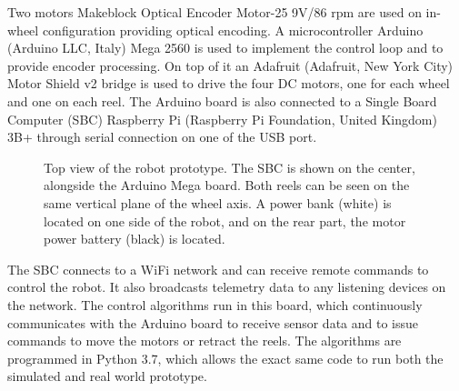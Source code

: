 \documentclass[journal]{IEEEtran}
\begin{document}
Two motors Makeblock Optical Encoder Motor-25 9V/86 rpm are used on in-wheel configuration providing optical encoding.  A microcontroller Arduino (Arduino LLC, Italy) Mega 2560 is used to implement the control loop and to provide encoder processing.  On top of it an Adafruit (Adafruit, New York City) Motor Shield v2 bridge is used to drive the four DC motors, one for each wheel and one on each reel.   The Arduino board is also connected to a Single Board Computer (SBC) Raspberry Pi (Raspberry Pi Foundation, United Kingdom) 3B+ through serial connection on one of the USB port.

\begin{figure}[!t]
\centering
{}
\caption{Top view of the robot prototype.  The SBC is shown on the center, alongside the Arduino Mega board.  Both reels can be seen on the same vertical plane of the wheel axis. A power bank (white) is located on one side of the robot, and on the rear part, the motor power battery (black) is located.}
\label{fig:alpibot2}
\end{figure}

The SBC connects to a WiFi network and can receive remote commands to control the robot. It also broadcasts telemetry data to any listening devices on the network. The control algorithms run in this board, which continuously communicates with the Arduino board to receive sensor data and to issue commands to move the motors or retract the reels.   The algorithms are programmed in Python 3.7, which allows the exact same code to run both the simulated and real world prototype.  
\end{document}
